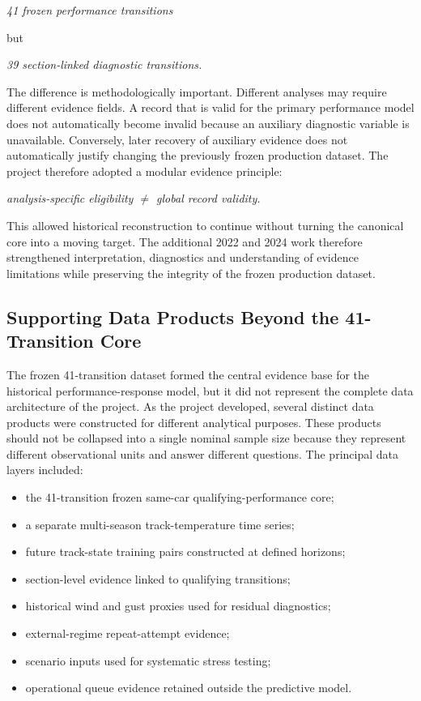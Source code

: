 \begin{center}\textit{41 frozen performance transitions}\end{center}

but

\begin{center}\textit{39 section-linked diagnostic transitions.}\end{center}

The difference is methodologically important. Different analyses may require different evidence fields. A record that is valid for the primary performance model does not automatically become invalid because an auxiliary diagnostic variable is unavailable. Conversely, later recovery of auxiliary evidence does not automatically justify changing the previously frozen production dataset. The project therefore adopted a modular evidence principle:

\begin{center}\textit{analysis-specific eligibility \ensuremath{\neq} global record validity.}\end{center}

This allowed historical reconstruction to continue without turning the canonical core into a moving target. The additional 2022 and 2024 work therefore strengthened interpretation, diagnostics and understanding of evidence limitations while preserving the integrity of the frozen production dataset.

\subsection{Supporting Data Products Beyond the 41-Transition Core}
The frozen 41-transition dataset formed the central evidence base for the historical performance-response model, but it did not represent the complete data architecture of the project. As the project developed, several distinct data products were constructed for different analytical purposes. These products should not be collapsed into a single nominal sample size because they represent different observational units and answer different questions. The principal data layers included:

\begin{itemize}
\item the 41-transition frozen same-car qualifying-performance core;
\item a separate multi-season track-temperature time series;
\item future track-state training pairs constructed at defined horizons;
\item section-level evidence linked to qualifying transitions;
\item historical wind and gust proxies used for residual diagnostics;
\item external-regime repeat-attempt evidence;
\item scenario inputs used for systematic stress testing;
\item operational queue evidence retained outside the predictive model.
\end{itemize}

